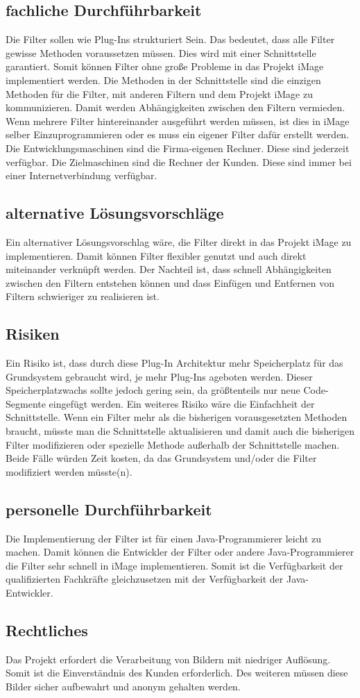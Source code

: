 \documentclass[parskip=full]{scrartcl}
\begin{document}
\subsection{fachliche Durchführbarkeit}
Die Filter sollen wie Plug-Ins strukturiert Sein. Das bedeutet, dass alle Filter gewisse Methoden voraussetzen müssen. Dies wird mit einer Schnittstelle garantiert. Somit können Filter ohne große Probleme in das Projekt iMage implementiert werden. Die Methoden in der Schnittstelle sind die einzigen Methoden für die Filter, mit anderen Filtern und dem Projekt iMage zu kommunizieren. Damit werden Abhängigkeiten zwischen den Filtern vermieden. Wenn mehrere Filter hintereinander ausgeführt werden müssen, ist dies in iMage selber Einzuprogrammieren oder es muss ein eigener Filter dafür erstellt werden.
\newline
Die Entwicklungsmaschinen sind die Firma-eigenen Rechner. Diese sind jederzeit verfügbar. Die Zielmaschinen sind die Rechner der Kunden. Diese sind immer bei einer Internetverbindung verfügbar.

\subsection{alternative Lösungsvorschläge}
Ein alternativer Lösungsvorschlag wäre, die Filter direkt in das Projekt iMage zu implementieren. Damit können Filter flexibler genutzt und auch direkt miteinander verknüpft werden. Der Nachteil ist, dass schnell Abhängigkeiten zwischen den Filtern entstehen können und dass Einfügen und Entfernen von Filtern schwieriger zu realisieren ist.

\subsection{Risiken}
Ein Risiko ist, dass durch diese Plug-In Architektur mehr Speicherplatz für das Grundsystem gebraucht wird, je mehr Plug-Ins ageboten werden. Dieser Speicherplatzwachs sollte jedoch gering sein, da größtenteils nur neue Code-Segmente eingefügt werden.
Ein weiteres Risiko wäre die Einfachheit der Schnittstelle. Wenn ein Filter mehr als die bisherigen vorausgesetzten Methoden braucht, müsste man die Schnittstelle aktualisieren und damit auch die bisherigen Filter modifizieren oder spezielle Methode außerhalb der Schnittstelle machen. Beide Fälle würden Zeit kosten, da das Grundsystem und/oder die Filter modifiziert werden müsste(n).
\subsection{personelle Durchführbarkeit}
Die Implementierung der Filter ist für einen Java-Programmierer leicht zu machen. Damit können die Entwickler der Filter oder andere Java-Programmierer die Filter sehr schnell in iMage implementieren. Somit ist die Verfügbarkeit der qualifizierten Fachkräfte gleichzusetzen mit der Verfügbarkeit der Java-Entwickler. 
\subsection{Rechtliches}
Das Projekt erfordert die Verarbeitung von Bildern mit niedriger Auflösung. Somit ist die Einverständnis des Kunden erforderlich. Des weiteren müssen diese Bilder sicher aufbewahrt und anonym gehalten werden. 
\end{document}
